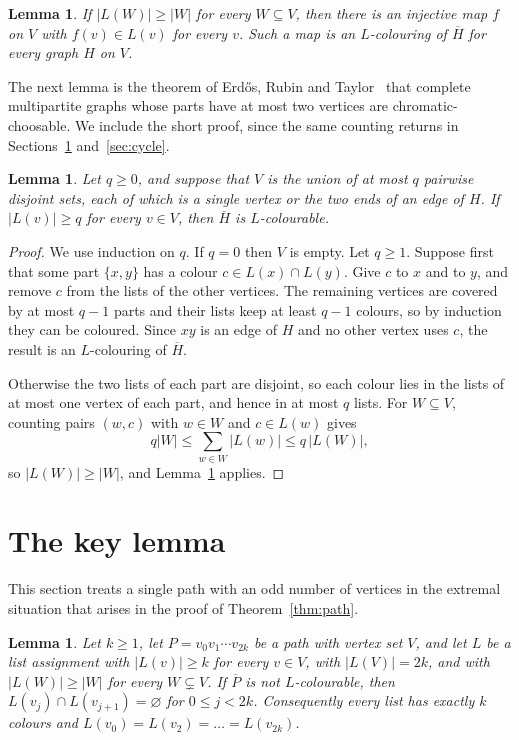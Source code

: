 \documentclass[11pt,a4paper,reqno]{amsart}
\newtheorem{lemma}[theorem]{Lemma}
\theoremstyle{definition}
\theoremstyle{remark}
\begin{document}
\begin{lemma}\label{lem:hall}
If $|L(W)|\ge|W|$ for every $W\subseteq V$, then there is an injective map $f$ on $V$ with $f(v)\in L(v)$ for every $v$. Such a map is an $L$-colouring of $\overline H$ for every graph $H$ on $V$.
\end{lemma}

The next lemma is the theorem of Erd\H{o}s, Rubin and Taylor~\cite{ERT} that complete multipartite graphs whose parts have at most two vertices are chromatic-choosable. We include the short proof, since the same counting returns in Sections~\ref{sec:key} and~\ref{sec:cycle}.

\begin{lemma}\label{lem:ert}
Let $q\ge0$, and suppose that $V$ is the union of at most $q$ pairwise disjoint sets, each of which is a single vertex or the two ends of an edge of $H$. If $|L(v)|\ge q$ for every $v\in V$, then $\overline H$ is $L$-colourable.
\end{lemma}

\begin{proof}
We use induction on $q$. If $q=0$ then $V$ is empty. Let $q\ge1$. Suppose first that some part $\{x,y\}$ has a colour $c\in L(x)\cap L(y)$. Give $c$ to $x$ and to $y$, and remove $c$ from the lists of the other vertices. The remaining vertices are covered by at most $q-1$ parts and their lists keep at least $q-1$ colours, so by induction they can be coloured. Since $xy$ is an edge of $H$ and no other vertex uses $c$, the result is an $L$-colouring of $\overline H$.

Otherwise the two lists of each part are disjoint, so each colour lies in the lists of at most one vertex of each part, and hence in at most $q$ lists. For $W\subseteq V$, counting pairs $(w,c)$ with $w\in W$ and $c\in L(w)$ gives
\[
q|W|\le\sum_{w\in W}|L(w)|\le q\,|L(W)|,
\]
so $|L(W)|\ge|W|$, and Lemma~\ref{lem:hall} applies.
\end{proof}

\section{The key lemma}\label{sec:key}

This section treats a single path with an odd number of vertices in the extremal situation that arises in the proof of Theorem~\ref{thm:path}.

\begin{lemma}\label{lem:key}
Let $k\ge1$, let $P=v_0v_1\cdots v_{2k}$ be a path with vertex set $V$, and let $L$ be a list assignment with $|L(v)|\ge k$ for every $v\in V$, with $|L(V)|=2k$, and with $|L(W)|\ge|W|$ for every $W\subsetneq V$. If $\overline P$ is not $L$-colourable, then $L(v_j)\cap L(v_{j+1})=\varnothing$ for $0\le j<2k$. Consequently every list has exactly $k$ colours and $L(v_0)=L(v_2)=\dots=L(v_{2k})$.
\end{lemma}
\end{document}
